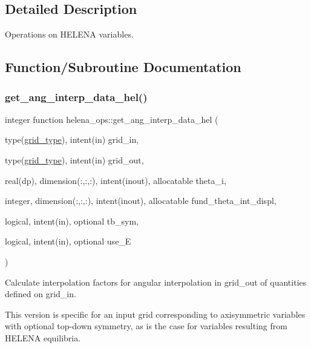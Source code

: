 \subsection{Detailed Description}
Operations on H\+E\+L\+E\+NA variables. 

\subsection{Function/\+Subroutine Documentation}
\mbox{\label{namespacehelena__ops_ab1329afe5af2ff92d96f4be15a096b38}} 
\subsubsection{\texorpdfstring{get\+\_\+ang\+\_\+interp\+\_\+data\+\_\+hel()}{get\_ang\_interp\_data\_hel()}}
{\footnotesize\ttfamily integer function helena\+\_\+ops\+::get\+\_\+ang\+\_\+interp\+\_\+data\+\_\+hel (\begin{DoxyParamCaption}\item[{type(\hyperlink{structgrid__vars_1_1grid__type}{grid\+\_\+type}), intent(in)}]{grid\+\_\+in,  }\item[{type(\hyperlink{structgrid__vars_1_1grid__type}{grid\+\_\+type}), intent(in)}]{grid\+\_\+out,  }\item[{real(dp), dimension(\+:,\+:,\+:), intent(inout), allocatable}]{theta\+\_\+i,  }\item[{integer, dimension(\+:,\+:,\+:), intent(inout), allocatable}]{fund\+\_\+theta\+\_\+int\+\_\+displ,  }\item[{logical, intent(in), optional}]{tb\+\_\+sym,  }\item[{logical, intent(in), optional}]{use\+\_\+E }\end{DoxyParamCaption})}



Calculate interpolation factors for angular interpolation in {\ttfamily grid\+\_\+out} of quantities defined on {\ttfamily grid\+\_\+in}. 

This version is specific for an input grid corresponding to axisymmetric variables with optional top-\/down symmetry, as is the case for variables resulting from H\+E\+L\+E\+NA equilibria.

